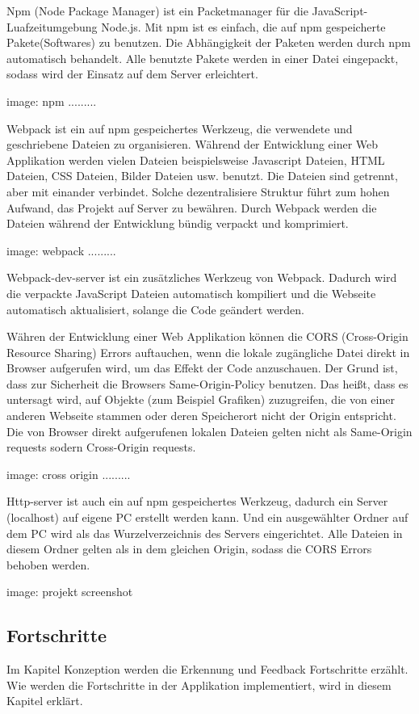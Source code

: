  Npm (Node Package Manager) ist ein Packetmanager für die JavaScript-Luafzeitumgebung Node.js. Mit npm ist es einfach, die auf npm gespeicherte Pakete(Softwares) zu benutzen. Die Abhängigkeit der Paketen werden durch npm automatisch behandelt. Alle benutzte Pakete werden in einer Datei eingepackt, sodass wird der Einsatz auf dem Server erleichtert.
 
 image: npm .........
 
 Webpack ist ein auf npm gespeichertes Werkzeug, die verwendete und geschriebene Dateien zu organisieren. Während der Entwicklung einer Web Applikation werden vielen Dateien beispielsweise Javascript Dateien, HTML Dateien, CSS Dateien, Bilder Dateien usw. benutzt. Die Dateien sind getrennt, aber mit einander verbindet. Solche dezentralisiere Struktur führt zum hohen Aufwand, das Projekt auf Server zu bewähren. Durch Webpack werden die Dateien während der Entwicklung bündig verpackt und komprimiert.
 
 image: webpack .........
 
 Webpack-dev-server ist ein zusätzliches Werkzeug von Webpack. Dadurch wird die verpackte JavaScript Dateien automatisch kompiliert und die Webseite automatisch aktualisiert, solange die Code geändert werden.
 
 Währen der Entwicklung einer Web Applikation können die CORS (Cross-Origin Resource Sharing) Errors auftauchen, wenn die lokale zugängliche Datei direkt in Browser aufgerufen wird, um das Effekt der Code anzuschauen. Der Grund ist, dass zur Sicherheit die Browsers Same-Origin-Policy benutzen. Das heißt, dass es untersagt wird, auf Objekte (zum Beispiel Grafiken) zuzugreifen, die von einer anderen Webseite stammen oder deren Speicherort nicht der Origin entspricht. Die von Browser direkt aufgerufenen lokalen Dateien gelten nicht als Same-Origin requests sodern Cross-Origin requests.
 
 image: cross origin .........
 
 Http-server ist auch ein auf npm gespeichertes Werkzeug, dadurch ein Server (localhost) auf eigene PC erstellt werden kann. Und ein ausgewählter Ordner auf dem PC wird als das Wurzelverzeichnis des Servers eingerichtet. Alle Dateien in diesem Ordner gelten als in dem gleichen Origin, sodass die CORS Errors behoben werden.
 
 image: projekt screenshot 
 
 \subsection{Fortschritte}
 Im Kapitel Konzeption werden die Erkennung und Feedback Fortschritte erzählt. Wie werden die Fortschritte in der Applikation implementiert, wird in diesem Kapitel erklärt.
 
